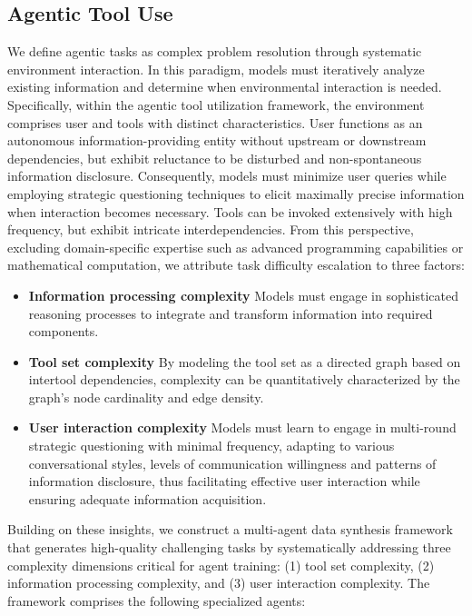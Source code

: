 \documentclass{article}
\begin{document}
\subsection{Agentic Tool Use}
We define agentic tasks as complex problem resolution through systematic environment interaction. In this paradigm, models must iteratively analyze existing information and determine when environmental interaction is needed. Specifically, within the agentic tool utilization framework, the environment comprises user and tools with distinct characteristics. User functions as an autonomous information-providing entity without upstream or downstream dependencies, but exhibit reluctance to be disturbed and non-spontaneous information disclosure. Consequently, models must minimize user queries while employing strategic questioning techniques to elicit maximally precise information when interaction becomes necessary. Tools can be invoked extensively with high frequency, but exhibit intricate interdependencies. From this perspective, excluding domain-specific expertise such as advanced programming capabilities or mathematical computation, we attribute task difficulty escalation to three factors:
\begin{itemize}%
\item \textbf{Information processing complexity} 
Models must engage in sophisticated reasoning processes to integrate and transform information into required components.
\item \textbf{Tool set complexity} 
By modeling the tool set as a directed graph based on intertool dependencies, complexity can be quantitatively characterized by the graph's node cardinality and edge density.
\item \textbf{User interaction complexity}
Models must learn to engage in multi-round strategic questioning with minimal frequency, adapting to various conversational styles, levels of communication willingness and patterns of information disclosure, thus facilitating effective user interaction while ensuring adequate information acquisition.
\end{itemize}



Building on these insights, we construct a multi-agent data synthesis framework that generates high-quality challenging tasks by systematically addressing three complexity dimensions critical for agent training: (1) tool set complexity, (2) information processing complexity, and (3) user interaction complexity. The framework comprises the following specialized agents:
\end{document}
